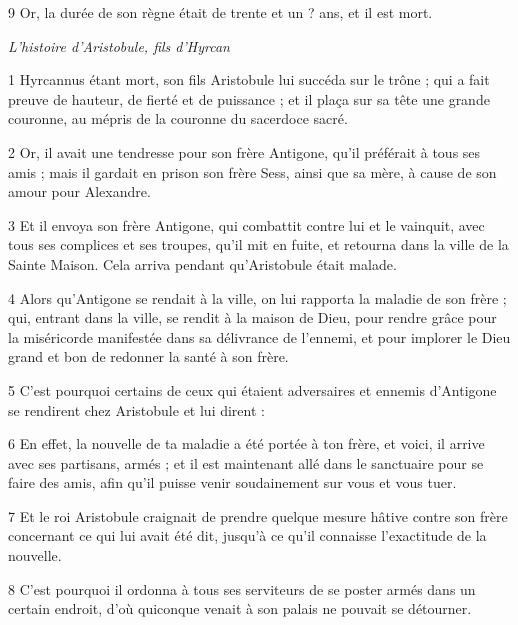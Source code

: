 \par 9 Or, la durée de son règne était de trente et un ? ans, et il est mort.


\par \textit{L'histoire d'Aristobule, fils d'Hyrcan}

\par 1 Hyrcannus étant mort, son fils Aristobule lui succéda sur le trône ; qui a fait preuve de hauteur, de fierté et de puissance ; et il plaça sur sa tête une grande couronne, au mépris de la couronne du sacerdoce sacré.

\par 2 Or, il avait une tendresse pour son frère Antigone, qu'il préférait à tous ses amis ; mais il gardait en prison son frère Sess, ainsi que sa mère, à cause de son amour pour Alexandre.

\par 3 Et il envoya son frère Antigone, qui combattit contre lui et le vainquit, avec tous ses complices et ses troupes, qu'il mit en fuite, et retourna dans la ville de la Sainte Maison. Cela arriva pendant qu'Aristobule était malade.

\par 4 Alors qu'Antigone se rendait à la ville, on lui rapporta la maladie de son frère ; qui, entrant dans la ville, se rendit à la maison de Dieu, pour rendre grâce pour la miséricorde manifestée dans sa délivrance de l'ennemi, et pour implorer le Dieu grand et bon de redonner la santé à son frère.

\par 5 C'est pourquoi certains de ceux qui étaient adversaires et ennemis d'Antigone se rendirent chez Aristobule et lui dirent :

\par 6 En effet, la nouvelle de ta maladie a été portée à ton frère, et voici, il arrive avec ses partisans, armés ; et il est maintenant allé dans le sanctuaire pour se faire des amis, afin qu'il puisse venir soudainement sur vous et vous tuer.

\par 7 Et le roi Aristobule craignait de prendre quelque mesure hâtive contre son frère concernant ce qui lui avait été dit, jusqu'à ce qu'il connaisse l'exactitude de la nouvelle.

\par 8 C'est pourquoi il ordonna à tous ses serviteurs de se poster armés dans un certain endroit, d'où quiconque venait à son palais ne pouvait se détourner.

